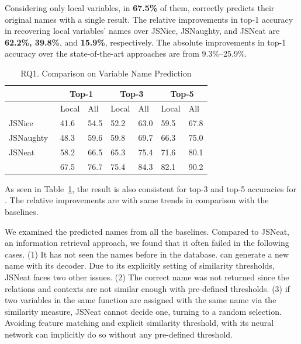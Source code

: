 Considering only local variables, in {\bf 67.5\%} of them, {\tool}
correctly predicts their original names with a single result. The
relative improvements in top-1 accuracy in recovering local variables'
names over JSNice, JSNaughty, and JSNeat are {\bf 62.2\%, 39.8\%}, and
{\bf 15.9\%}, respectively. The absolute improvements in top-1
accuracy over the state-of-the-art approaches are from 9.3\%--25.9\%.

\begin{table}[t]%
  \caption{RQ1. Comparison on Variable Name Prediction}
  \vspace{-8pt}
	\begin{center}
		\small
		\renewcommand{\arraystretch}{1} \begin{tabular}{|p{1.9cm}<{\centering}|p{0.65cm}<{\centering}|p{0.65cm}<{\centering}|p{0.65cm}<{\centering}|p{0.65cm}<{\centering}|p{0.65cm}<{\centering}|p{0.65cm}<{\centering}|}
			
			\hline
                       & \multicolumn{2}{c|}{Top-1}         & \multicolumn{2}{c|}{Top-3}         & \multicolumn{2}{c|}{Top-5} \\
			\hline
                       & Local & All & Local & All & Local & All  \\ 
			\hline
		        JSNice~\cite{JSNice2015} &  41.6    & 54.5  & 52.2 &    63.0   & 59.5      &   67.8    \\
			JSNaughty~\cite{JSNaughty2017}  &   48.3   &  59.6    &  59.8    &  69.7    &  66.3    &   75.0    \\
			JSNeat~\cite{icse19}  &   58.2   &  66.5    &  65.3    & 75.4     &  71.6    & 80.1     \\
			\hline
			{\bf {\tool}} & 67.5 & 76.7 & 75.4 & 84.3 & 82.1 & 90.2 \\
			\hline
		\end{tabular}
		\label{name-result}
	\end{center}
\end{table}

As seen in Table~\ref{name-result}, the result is also consistent for
top-3 and top-5 accuracies for {\tool}. The relative improvements are
with same trends in comparison with the baselines.

We examined the predicted names from all the baselines. Compared to
JSNeat, an information retrieval approach, we found that it often
failed in the following cases. (1) It has not seen the names before in
the database. {\tool} can generate a new name with its decoder. Due to its
explicitly setting of similarity thresholds, JSNeat faces two other
issues. (2) The correct name was not returned since the relations
and contexts are not similar enough with pre-defined thresholds.  (3)
if two variables in the same function are assigned with the same name
via the similarity measure, JSNeat cannot decide one, turning to a
random selection. Avoiding feature matching and explicit similarity
threshold, {\tool} with its neural network can implicitly do so
without any pre-defined threshold.

